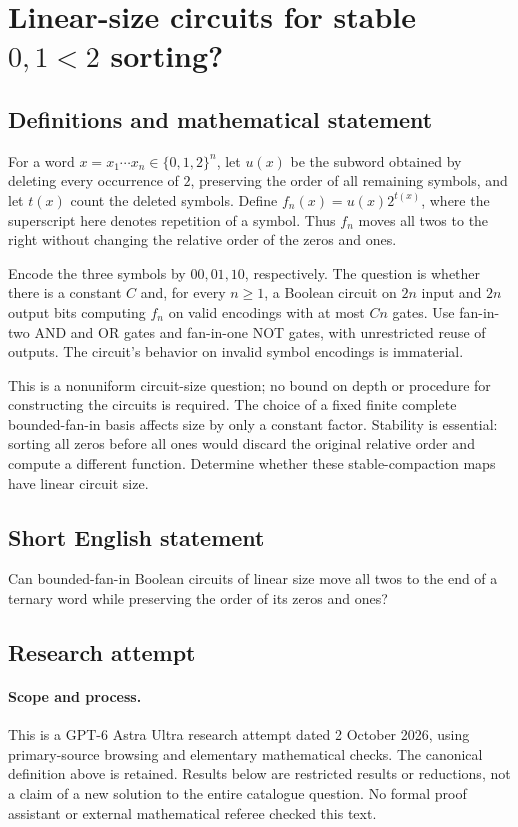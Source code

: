 \documentclass[11pt,a4paper]{article}
\begin{document}
\section*{Linear-size circuits for stable $0,1 < 2$ sorting?}\label{statement}

\subsection{Definitions and mathematical statement}
For a word $x=x_1\cdots x_n\in\{0,1,2\}^n$, let $u(x)$ be the
subword obtained by deleting every occurrence of $2$, preserving
the order of all remaining symbols, and let $t(x)$ count the deleted
symbols. Define $f_n(x)=u(x)2^{t(x)}$, where the superscript here
denotes repetition of a symbol. Thus $f_n$ moves all twos to the
right without changing the relative order of the zeros and ones.

Encode the three symbols by $00,01,10$, respectively. The question
is whether there is a constant $C$ and, for every $n\ge1$, a Boolean
circuit on $2n$ input and $2n$ output bits computing $f_n$ on valid
encodings with at most $Cn$ gates. Use fan-in-two AND and OR gates
and fan-in-one NOT gates, with unrestricted reuse of outputs.
The circuit's behavior on invalid symbol encodings is immaterial.

This is a nonuniform circuit-size question; no bound on depth or
procedure for constructing the circuits is required. The choice of
a fixed finite complete bounded-fan-in basis affects size by only
a constant factor. Stability is essential: sorting all zeros before
all ones would discard the original relative order and compute a
different function. Determine whether these stable-compaction maps
have linear circuit size.
\subsection{Short English statement}
Can bounded-fan-in Boolean circuits of linear size move all twos to the end of a ternary word while preserving the order of its zeros and ones?
\subsection{Research attempt}
\paragraph{Scope and process.}
This is a GPT-6 Astra Ultra research attempt dated 2 October 2026, using
primary-source browsing and elementary mathematical checks. The canonical
definition above is retained. Results below are restricted results or
reductions, not a claim of a new solution to the entire catalogue question.
No formal proof assistant or external mathematical referee checked this text.
\end{document}
